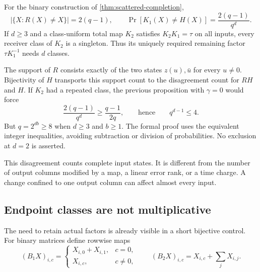 \begin{theorem}
\label{thm:scattered-second-factor}
For the binary construction of \cref{thm:scattered-completion},
\[
 |\{X:R(X)\ne X\}|=2(q-1),\qquad
 \Pr[K_1(X)\ne H(X)]=\frac{2(q-1)}{q^d}.
\]
If $d\ge3$ and a class-uniform total map $K_2$ satisfies
$K_2K_1=\tau$ on all inputs, every receiver class of $K_2$ is a
singleton.  Thus its uniquely required remaining factor
$\tau K_1^{-1}$ needs $d$ classes.
\end{theorem}
\begin{outline}
The support of $R$ consists exactly of the two states $z(u),\bar u$
for every $u\ne0$.  Bijectivity of $H$ transports this support count
to the disagreement count for $RH$ and $H$.
If $K_2$ had a repeated class, the previous proposition with
$\gamma=0$ would force
\[
 \frac{2(q-1)}{q^d}\ge\frac{q-1}{2q},
 \qquad\text{hence}\qquad q^{d-1}\le4.
\]
But $q=2^{db}\ge8$ when $d\ge3$ and $b\ge1$.
The formal proof uses the equivalent integer inequalities, avoiding
subtraction or division of probabilities.  No exclusion at $d=2$ is
asserted.
\end{outline}

This disagreement counts complete input states.  It is different from
the number of output columns modified by a map, a linear error rank,
or a time charge.  A change confined to one output column can affect
almost every input.

\subsection{Endpoint classes are not multiplicative}

The need to retain actual factors is already visible in a short
bijective control.  For binary matrices define rowwise maps
\[
 (B_1X)_{i,c}=\begin{cases}X_{i,0}+X_{i,1},&c=0,\\X_{i,c},&c\ne0,\end{cases}
 \qquad
 (B_2X)_{i,c}=X_{i,c}+\sum_jX_{i,j}.
\]

